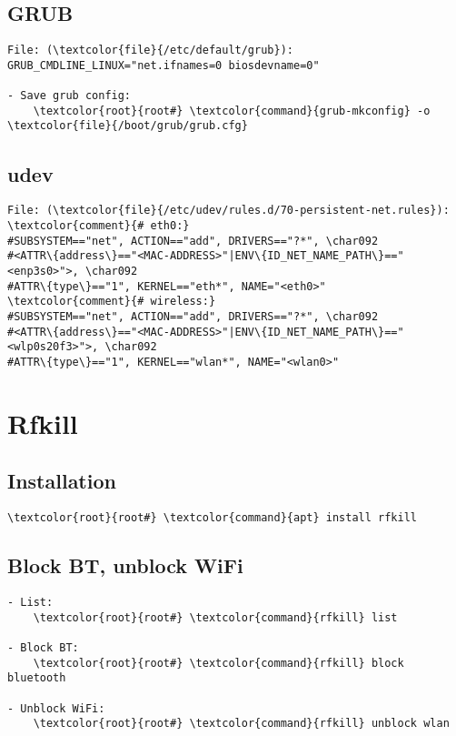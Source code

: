 \documentclass[10pt, a4paper, onecolumn, openany]{book} %
\begin{document}
\subsection{GRUB}
\begin{Verbatim}[commandchars=\\\{\}]
File: (\textcolor{file}{/etc/default/grub}):
GRUB_CMDLINE_LINUX="net.ifnames=0 biosdevname=0"

- Save grub config:
    \textcolor{root}{root#} \textcolor{command}{grub-mkconfig} -o \textcolor{file}{/boot/grub/grub.cfg}
\end{Verbatim}

\subsection{udev}
\begin{Verbatim}[commandchars=\\\{\}]
File: (\textcolor{file}{/etc/udev/rules.d/70-persistent-net.rules}):
\textcolor{comment}{# eth0:}
#SUBSYSTEM=="net", ACTION=="add", DRIVERS=="?*", \char092
#<ATTR\{address\}=="<MAC-ADDRESS>"|ENV\{ID_NET_NAME_PATH\}=="<enp3s0>">, \char092
#ATTR\{type\}=="1", KERNEL=="eth*", NAME="<eth0>"
\textcolor{comment}{# wireless:}
#SUBSYSTEM=="net", ACTION=="add", DRIVERS=="?*", \char092
#<ATTR\{address\}=="<MAC-ADDRESS>"|ENV\{ID_NET_NAME_PATH\}=="<wlp0s20f3>">, \char092
#ATTR\{type\}=="1", KERNEL=="wlan*", NAME="<wlan0>"
\end{Verbatim}


\section{Rfkill}
\subsection{Installation}
\begin{Verbatim}[commandchars=\\\{\}]
    \textcolor{root}{root#} \textcolor{command}{apt} install rfkill
\end{Verbatim}
\subsection{Block BT, unblock WiFi}
\begin{Verbatim}[commandchars=\\\{\}]
- List:
    \textcolor{root}{root#} \textcolor{command}{rfkill} list

- Block BT:
    \textcolor{root}{root#} \textcolor{command}{rfkill} block bluetooth
    
- Unblock WiFi:
    \textcolor{root}{root#} \textcolor{command}{rfkill} unblock wlan
\end{Verbatim}
\end{document}
